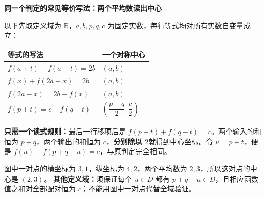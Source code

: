 \begin{statementbox}
\textbf{同一个判定的常见等价写法：两个平均数读出中心}


以下先取定义域为 $\mathbb R$，$a,b,p,q,c$ 为固定实数，每行等式均对所有实数自变量成立：
\begin{center}
\renewcommand{\arraystretch}{1.45}
\begin{tabular}{p{.56\linewidth}|p{.28\linewidth}}
等式的写法 & 一个对称中心\\\hline
$f(a+t)+f(a-t)=2b$ & $(a,b)$\\
$f(x)+f(2a-x)=2b$ & $(a,b)$\\
$f(2a-x)=2b-f(x)$ & $(a,b)$\\
$f(p+t)=c-f(q-t)$ & $\left(\dfrac{p+q}{2},\dfrac c2\right)$
\end{tabular}
\end{center}
\textbf{只需一个读式规则：}最后一行移项后是 $f(p+t)+f(q-t)=c$。两个输入的和恒为 $p+q$，两个输出的和恒为 $c$，\textbf{分别除以 $2$}就得到中心坐标。令 $u=p+t$，便是 $f(u)+f(p+q-u)=c$，与原判定完全相同。

图中一对点的横坐标为 $3,1$，纵坐标为 $4,2$，两个平均数为 $2,3$，所以这对点的中心是 $(2,3)$。
\textbf{其他定义域：}须保证每个 $u\in D$ 都有 $p+q-u\in D$，且相应函数值之和对全部配对恒为 $c$；不能用图中一对点代替全域验证。
\end{statementbox}
